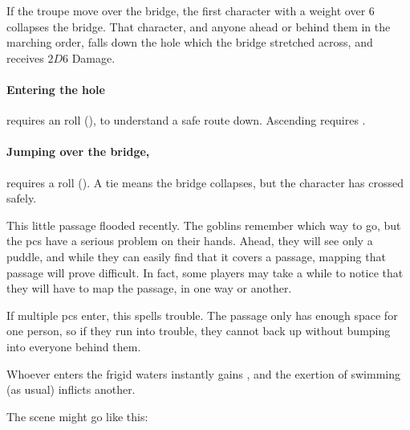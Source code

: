 \begin{multicols}{2}
If the troupe move over the bridge, the first character with a \gls{weight} over 6 collapses the bridge.
That character, and anyone ahead or behind them in the marching order, falls down the hole which the bridge stretched across, and receives $2D6$ Damage.

\paragraph{Entering the hole}
requires an  roll (\tn[10]), to understand a safe route down.
Ascending requires \tn[12].

\paragraph{Jumping over the bridge,}
requires a  roll (\tn[9]).
A tie means the bridge collapses, but the character has crossed safely.


This little passage flooded recently.
The goblins remember which way to go, but the \glspl{pc} have a serious problem on their hands.
Ahead, they will see only a puddle, and while they can easily find that it covers a passage, mapping that passage will prove difficult.
In fact, some players may take a while to notice that they will have to map the passage, in one way or another.

If multiple \glspl{pc} enter, this spells trouble.
The passage only has enough space for one person, so if they run into trouble, they cannot back up without bumping into everyone behind them.

Whoever enters the frigid waters instantly gains , and the exertion of swimming (as usual) inflicts another.

The scene might go like this:


\end{multicols}
